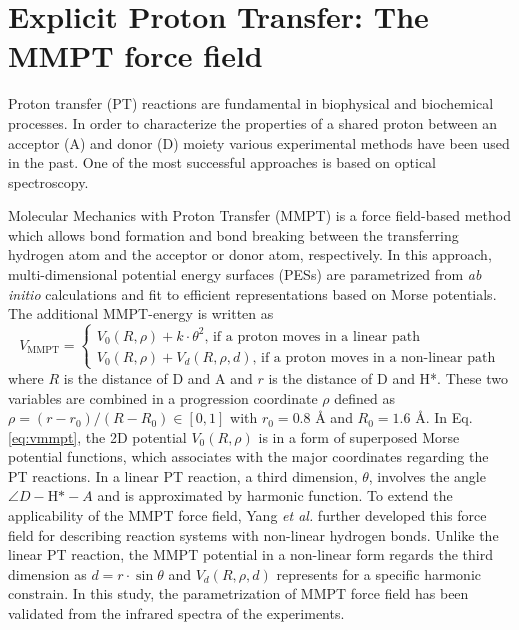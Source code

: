 \documentclass[journal=jacsat,manuscript=article]{achemso}
\author{Zhen-Hao Xu, Krystel El Hage and Markus Meuwly}
\affiliation{Department of Chemistry, University of Basel, Klingelbergstrasse 80, CH-4056 Basel, Switzerland.}
\date{\today}
\title{}
\begin{document}
\begin{abstract}

\end{abstract}

\clearpage

\section{Explicit Proton Transfer: The MMPT force field}
Proton transfer (PT) reactions are fundamental in biophysical and
biochemical processes. In order to characterize the properties of a
shared proton between an acceptor (A) and donor (D) moiety various
experimental methods have been used in the past. One of the most
successful approaches is based on optical
spectroscopy.\cite{wolke.sci.2016.watercluster,fournier.pnas.2014.watercluster,mackeprangmeuwly.pccp.2016.mmpt,wolkejohnson.jpca.2015.oxalate,howardmeuwly.jpca.2015.mmpt} 


\noindent
Molecular Mechanics with Proton Transfer (MMPT) is a force field-based
method which allows bond formation and bond breaking between the
transferring hydrogen atom and the acceptor or donor atom,
respectively.\cite{lammersmeuwly.jcc.2008.mmpt} In this approach,
multi-dimensional potential energy surfaces (PESs) are parametrized
from \emph{ab initio} calculations and fit to efficient
representations based on Morse potentials. The additional MMPT-energy
is written as
\begin{equation}
V_{\textrm{MMPT}}=\left\{
\begin{array}{ll}
V_{0}(R,\rho)+k\cdot\theta^2\textrm{, if a proton moves in a linear path}\\
V_{0}(R,\rho)+V_{d}(R,\rho,d)\textrm{, if a proton moves in a non-linear path}
\end{array}
\right.
\label{eq:vmmpt}
\end{equation}
where $R$ is the distance of D and A and $r$ is the distance of D and
H*. These two variables are combined in a progression coordinate
$\rho$ defined as $\rho=(r-r_0)/(R-R_0)\in [0,1]$ with $r_0 = 0.8$
\AA\/ and $R_0 = 1.6$ \AA\/. In Eq. \ref{eq:vmmpt}, the 2D potential
$V_{0}(R,\rho)$ is in a form of superposed Morse potential functions,
which associates with the major coordinates regarding the PT
reactions. In a linear PT reaction, a third dimension, $\theta$,
involves the angle $\angle D-\textrm{H*}-A$ and is approximated by
harmonic
function.\cite{lammersmeuwly.jcc.2008.mmpt,lammersmeuwly.jpca.2007.mmptdpt}
To extend the applicability of the MMPT force field, Yang \emph{et
  al.}\cite{yangmeuwly.jcp.2010.mmpt} further developed this force
field for describing reaction systems with non-linear hydrogen bonds.
Unlike the linear PT reaction, the MMPT potential in a non-linear form
regards the third dimension as $d = r \cdot \sin \theta$ and
$V_{d}(R,\rho,d)$ represents for a specific harmonic constrain. In
this study, the parametrization of MMPT force field has been validated
from the infrared spectra of the experiments.  \\
\end{document}
